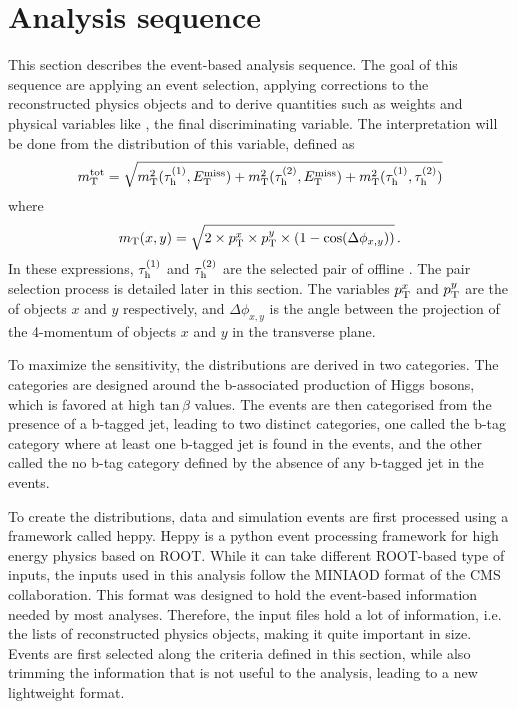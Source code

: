 \section{Analysis sequence}
\label{sec:analysis_eventsel}

This section describes the event-based analysis sequence. The goal of this sequence are applying an event selection, applying corrections to the reconstructed physics objects and to derive quantities such as weights and physical variables like \mttot, the final discriminating variable. The interpretation will be done from the distribution of this variable, defined as 
\begin{equation}
    m_{\mathrm{T}}^{\mathrm{tot}} = \sqrt{m_{\mathrm{T}}^2(\tau_{\rm h}^{(1)},E_{\mathrm{T}}^{\text{miss}}) + m_{\mathrm{T}}^2(\tau_{\rm h}^{(2)},E_{\mathrm{T}}^{\text{miss}}) + m_{\mathrm{T}}^2(\tau_{\rm h}^{(1)},\tau_{\rm h}^{(2)})}
\end{equation}
where
\begin{equation}
    m_{\mathrm{T}} (x,y) = \sqrt{2\times \pt^x \times \pt^y \times (1-\mathrm{cos}(\Delta \phi_{x,y}))} \mend
\end{equation}
In these expressions, $\tau_{\rm h}^{(1)}$ and $\tau_{\rm h}^{(2)}$ are the selected pair of offline \tauh. The \tauh pair selection process is detailed later in this section. The variables $p_{\mathrm{T}}^x$ and $p_{\mathrm{T}}^y$ are the \pt of objects $x$ and $y$ respectively, and $\Delta \phi_{x,y}$ is the angle between the projection of the 4-momentum of objects $x$ and $y$ in the transverse plane. 

To maximize the sensitivity, the \mttot distributions are derived in two categories. The categories are designed around the b-associated production of Higgs bosons, which is favored at high $\mathrm{tan}\,\beta$ values. The events are then categorised from the presence of a b-tagged jet, leading to two distinct categories, one called the b-tag category where at least one b-tagged jet is found in the events, and the other called the no b-tag category defined by the absence of any b-tagged jet in the events. 


To create the distributions, data and simulation events are first processed using a framework called heppy. Heppy is a python event processing framework for high energy physics based on ROOT. While it can take different ROOT-based type of inputs, the inputs used in this analysis follow the MINIAOD format of the CMS collaboration. This format was designed to hold the event-based information needed by most analyses. Therefore, the input files hold a lot of information, i.e. the lists of reconstructed physics objects, making it quite important in size. Events are first selected along the criteria defined in this section, while also trimming the information that is not useful to the analysis, leading to a new lightweight format. 

